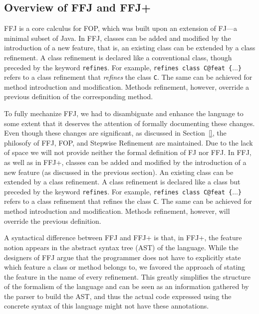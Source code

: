 \subsection{Overview of \ac{FFJ} and \ac{FFJ+}}\label{seq:offj}

\acf{FFJ} is a core calculus for \acf{FOP}, which was built 
upon an extension of \acf{FJ}---a minimal subset of Java. 
In \ac{FFJ}, classes can be added and modified by the 
introduction of a new feature, that is, 
an existing class can be extended by a class refinement. 
A class refinement is declared like a conventional class, though 
preceded by the keyword \texttt{refines}. For example, 
\texttt{refines class C@feat \{$\dots$\}} refers to a class
refinement that
\emph{refines} the class \texttt{C}. The same can be achieved 
for method introduction and modification. Methods refinement,
however, override a previous definition of the corresponding 
method.
 
To fully mechanize \ac{FFJ}, we had to disambiguate and enhance 
the language to some extent that it  deserves the attention of 
formally documenting these changes. 
Even though these changes are significant, as discussed in Section~\ref{}, 
the philosofy of \ac{FFJ}, \ac{FOP}, and Stepwise Refinement are maintained.
Due to the lack of space we will not provide neither the formal definition 
of \ac{FJ} nor \ac{FFJ}. 
In \ac{FFJ}, as well as in \ac{FFJ+}, classes can be added and 
modified by the introduction of a new feature (as discussed in the previous section).
An existing class can be extended by a class refinement. A class refinement is declared like a class but
preceded by the keyword \texttt{refines}. For example, \texttt{refines class C@feat \{$\dots$\}} refers to a class refinement that
refines the class \texttt{C}. The same can be achieved for method introduction and modification. Methods refinement,
however, will override the previous definition.

A syntactical difference between \ac{FFJ} and \ac{FFJ+} is that, in \ac{FFJ+}, 
the feature notion appears in the abstract syntax tree (AST) of the language.
While the designers of \ac{FFJ} argue that the programmer does not have 
to explicitly state which feature a class or method belongs to, 
we favored the approach of stating the feature in the name of every refinement.
This greatly simplifies the structure of the formalism of the language and can be 
seen as an information gathered by the parser to build the AST, and thus 
the actual code expressed using the concrete syntax of this language 
might not have these annotations.


